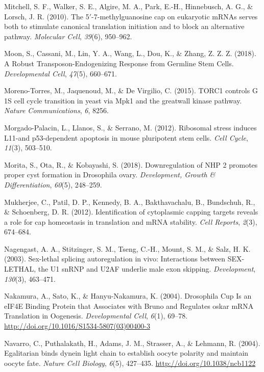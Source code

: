 \documentclass[12pt,oneside]{reedthesis}
\newlength{\cslhangindent}
\newenvironment{cslreferences}%
  {\setlength{\parindent}{0pt}%
  \everypar{\setlength{\hangindent}{\cslhangindent}}\ignorespaces}%
  {\par}
\begin{document}
\begin{cslreferences}
\leavevmode\hypertarget{ref-Mitchell2010}{}%
Mitchell, S. F., Walker, S. E., Algire, M. A., Park, E.-H., Hinnebusch, A. G., \& Lorsch, J. R. (2010). The 5\({'}\)-7-methylguanosine cap on eukaryotic mRNAs serves both to stimulate canonical translation initiation and to block an alternative pathway. \emph{Molecular Cell}, \emph{39}(6), 950--962.

\leavevmode\hypertarget{ref-Moon2018a}{}%
Moon, S., Cassani, M., Lin, Y. A., Wang, L., Dou, K., \& Zhang, Z. Z. Z. (2018). A Robust Transposon-Endogenizing Response from Germline Stem Cells. \emph{Developmental Cell}, \emph{47}(5), 660--671.

\leavevmode\hypertarget{ref-Moreno-Torres2015}{}%
Moreno-Torres, M., Jaquenoud, M., \& De Virgilio, C. (2015). TORC1 controls G 1S cell cycle transition in yeast via Mpk1 and the greatwall kinase pathway. \emph{Nature Communications}, \emph{6}, 8256.

\leavevmode\hypertarget{ref-Morgado-Palacin2012a}{}%
Morgado-Palacin, L., Llanos, S., \& Serrano, M. (2012). Ribosomal stress induces L11-and p53-dependent apoptosis in mouse pluripotent stem cells. \emph{Cell Cycle}, \emph{11}(3), 503--510.

\leavevmode\hypertarget{ref-Morita2018}{}%
Morita, S., Ota, R., \& Kobayashi, S. (2018). Downregulation of NHP 2 promotes proper cyst formation in Drosophila ovary. \emph{Development, Growth \& Differentiation}, \emph{60}(5), 248--259.

\leavevmode\hypertarget{ref-Mukherjee2012}{}%
Mukherjee, C., Patil, D. P., Kennedy, B. A., Bakthavachalu, B., Bundschuh, R., \& Schoenberg, D. R. (2012). Identification of cytoplasmic capping targets reveals a role for cap homeostasis in translation and mRNA stability. \emph{Cell Reports}, \emph{2}(3), 674--684.

\leavevmode\hypertarget{ref-Nagengast2003}{}%
Nagengast, A. A., Stitzinger, S. M., Tseng, C.-H., Mount, S. M., \& Salz, H. K. (2003). Sex-lethal splicing autoregulation in vivo: Interactions between SEX-LETHAL, the U1 snRNP and U2AF underlie male exon skipping. \emph{Development}, \emph{130}(3), 463--471.

\leavevmode\hypertarget{ref-Nakamura2004g}{}%
Nakamura, A., Sato, K., \& Hanyu-Nakamura, K. (2004). Drosophila Cup Is an eIF4E Binding Protein that Associates with Bruno and Regulates oskar mRNA Translation in Oogenesis. \emph{Developmental Cell}, \emph{6}(1), 69--78. \url{http://doi.org/10.1016/S1534-5807(03)00400-3}

\leavevmode\hypertarget{ref-Navarro2004b}{}%
Navarro, C., Puthalakath, H., Adams, J. M., Strasser, A., \& Lehmann, R. (2004). Egalitarian binds dynein light chain to establish oocyte polarity and maintain oocyte fate. \emph{Nature Cell Biology}, \emph{6}(5), 427--435. \url{http://doi.org/10.1038/ncb1122}


\end{cslreferences}
\end{document}
